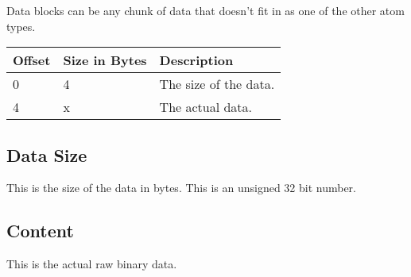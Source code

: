 Data blocks can be any chunk of data that doesn't fit in as one of the other 
atom types.

\begin{table}[h]
    \centering
    \label{tbl:data}
        \begin{tabular}{|l|l|l|}
        \hline
        \textbf{Offset} & \textbf{Size in Bytes} & \textbf{Description}  \\ \hline
        0               & 4                      & The size of the data. \\ \hline
        4               & x                      & The actual data.      \\ \hline
    \end{tabular}
\end{table}

\subsection{Data Size}
This is the size of the data in bytes. This is an unsigned 32 bit number.

\subsection{Content}
This is the actual raw binary data.